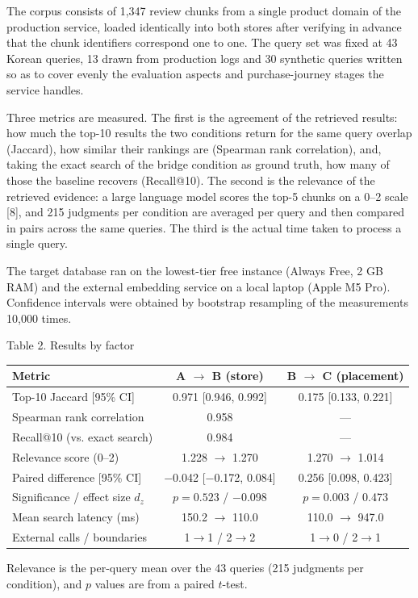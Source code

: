 \documentclass[10pt,a4paper,twocolumn]{article}
\newcommand{\pgsubsec}[1]{\par\vspace{4pt}{\bfseries\fontsize{12}{14}\selectfont #1}\par\nobreak\vspace{1pt}\nobreak}
\begin{document}
The corpus consists of 1,347 review chunks from a single product domain of the production service, loaded identically into both stores after verifying in advance that the chunk identifiers correspond one to one. The query set was fixed at 43 Korean queries, 13 drawn from production logs and 30 synthetic queries written so as to cover evenly the evaluation aspects and purchase-journey stages the service handles.

Three metrics are measured. The first is the agreement of the retrieved results: how much the top-10 results the two conditions return for the same query overlap (Jaccard), how similar their rankings are (Spearman rank correlation), and, taking the exact search of the bridge condition as ground truth, how many of those the baseline recovers (Recall@10). The second is the relevance of the retrieved evidence: a large language model scores the top-5 chunks on a 0--2 scale [8], and 215 judgments per condition are averaged per query and then compared in pairs across the same queries. The third is the actual time taken to process a single query.

The target database ran on the lowest-tier free instance (Always Free, 2 GB RAM) and the external embedding service on a local laptop (Apple M5 Pro). Confidence intervals were obtained by bootstrap resampling of the measurements 10,000 times.

\pgsubsec{3.2 Experimental Results}

\begin{table}[t]
\centering
{\fontsize{8}{9.6}\selectfont Table 2. Results by factor}
\vspace{4pt}

\fontsize{6.9}{8.1}\selectfont
\setlength{\tabcolsep}{2pt}
\begin{tabular}{@{}lcc@{}}
\toprule
Metric & A $\rightarrow$ B (store) & B $\rightarrow$ C (placement) \\
\midrule
Top-10 Jaccard [95\% CI] & 0.971 [0.946, 0.992] & 0.175 [0.133, 0.221] \\
Spearman rank correlation & 0.958 & --- \\
Recall@10 (vs. exact search) & 0.984 & --- \\
Relevance score (0--2) & 1.228 $\rightarrow$ 1.270 & 1.270 $\rightarrow$ 1.014 \\
Paired difference [95\% CI] & $-$0.042 [$-$0.172, 0.084] & 0.256 [0.098, 0.423] \\
Significance / effect size $d_z$ & $p = 0.523$ / $-$0.098 & $p = 0.003$ / 0.473 \\
Mean search latency (ms) & 150.2 $\rightarrow$ 110.0 & 110.0 $\rightarrow$ 947.0 \\
External calls / boundaries & 1$\rightarrow$1 / 2$\rightarrow$2 & 1$\rightarrow$0 / 2$\rightarrow$1 \\
\bottomrule
\end{tabular}

\vspace{4pt}
{\fontsize{6.9}{8.1}\selectfont Relevance is the per-query mean over the 43 queries (215 judgments per condition), and $p$ values are from a paired $t$-test.}
\end{table}
\end{document}
